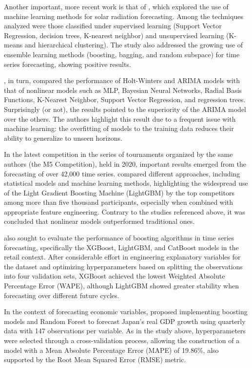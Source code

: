 Another important, more recent work is that of \cite{voyant2017machine}, which explored the use of machine learning methods for solar radiation forecasting. Among the techniques analyzed were those classified under supervised learning (Support Vector Regression, decision trees, K-nearest neighbor) and unsupervised learning (K-means and hierarchical clustering). The study also addressed the growing use of ensemble learning methods (boosting, bagging, and random subspace) for time series forecasting, showing positive results.

\cite{makridakis2018}, in turn, compared the performance of Holt-Winters and ARIMA models with that of nonlinear models such as MLP, Bayesian Neural Networks, Radial Basis Functions, K-Nearest Neighbor, Support Vector Regression, and regression trees. Surprisingly (or not), the results pointed to the superiority of the ARIMA model over the others. The authors highlight this result due to a frequent issue with machine learning: the overfitting of models to the training data reduces their ability to generalize to unseen horizons.

In the latest competition in the series of tournaments organized by the same authors (the M5 Competition), held in 2020, important results emerged from the forecasting of over 42,000 time series. \cite{MAKRIDAKISM5} compared different approaches, including statistical models and machine learning methods, highlighting the widespread use of the Light Gradient Boosting Machine (LightGBM) by the top competitors among more than five thousand participants, especially when combined with appropriate feature engineering. Contrary to the studies referenced above, it was concluded that nonlinear models outperformed traditional ones.

\cite{sousa2023comparing} also sought to evaluate the performance of boosting algorithms in time series forecasting, specifically the XGBoost, LightGBM, and CatBoost models in the retail context. After considerable effort in engineering explanatory variables for the dataset and optimizing hyperparameters based on splitting the observations into four validation sets, XGBoost achieved the lowest Weighted Absolute Percentage Error (WAPE), although LightGBM showed greater stability when forecasting over different future cycles.

In the context of forecasting economic variables, \cite{yoon2021forecasting} proposed implementing boosting models and Random Forest to forecast Japan's real GDP growth using quarterly data with 147 observations per variable. As in the study above, hyperparameters were selected through a cross-validation process, allowing the construction of a model with a Mean Absolute Percentage Error (MAPE) of 19.86\%, also supported by the Root Mean Squared Error (RMSE) metric.

